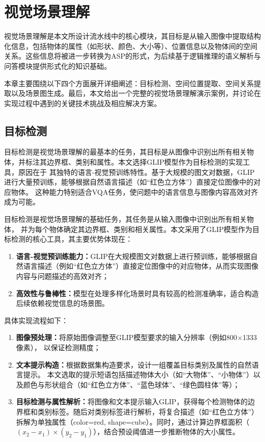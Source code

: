 \section{视觉场景理解}\label{visual-recognition}
视觉场景理解是本文所设计流水线中的核心模块，其目标是从输入图像中提取结构化信息，包括物体的属性（如形状、颜色、大小等）、位置信息以及物体间的空间关系。这些信息将被进一步转换为ASP的形式，为后续基于逻辑推理的语义解析与问答模块提供形式化的知识基础。

本章主要围绕以下四个方面展开详细阐述：目标检测、空间位置提取、空间关系提取以及场景图生成。最后，本文给出一个完整的视觉场景理解演示案例，并讨论在实现过程中遇到的关键技术挑战及相应解决方案。
\subsection{目标检测}
目标检测是视觉场景理解的最基本的任务，其目标是从图像中识别出所有相关物体，并标注其边界框、类别和属性。本文选择GLIP模型作为目标检测的实现工具，原因在于
其独特的语言-视觉预训练特性。基于大规模的图文对数据，GLIP进行大量预训练，能够根据自然语言描述（如“红色立方体”）直接定位图像中的对应物体。
这种能力特别适合VQA任务，使问题中的语言信息与图像内容高效对齐成为可能。

目标检测是视觉场景理解的基础任务，其任务是从输入图像中识别出所有相关物体，
并为每个物体确定其边界框、类别和相关属性。本文采用了GLIP模型作为目标检测的核心工具，其主要优势体现在：
\begin{enumerate}[label=(\arabic*),itemsep=0pt,parsep=0pt] 
\item \textbf{语言-视觉预训练能力：}GLIP在大规模图文对数据上进行预训练，能够根据自然语言描述（例如“红色立方体”）直接定位图像中的对应物体，从而实现图像内容与问题描述的高效对齐； 
\item \textbf{高效性与鲁棒性：}模型在处理多样化场景时具有较高的检测准确率，适合构造后续依赖视觉信息的场景图。 
\end{enumerate}

具体实现流程如下：
\begin{enumerate}[label=(\arabic*),itemsep=0pt] 
\item \textbf{图像预处理：}将原始图像调整至GLIP模型要求的输入分辨率（例如800$\times$1333像素），
以保证检测精度； 
\item \textbf{文本提示构造：}根据数据集构造要求，设计一组覆盖目标类别及属性的自然语言提示。
本文选取的提示短语包括描述物体大小（如“大物体”、“小物体”）以及颜色与形状组合（如“红色立方体”、“蓝色球体”、“绿色圆柱体”等）； 
\item \textbf{目标检测与属性解析：}将图像和文本提示输入GLIP，获得每个检测物体的边界框和类别标签。随后对类别标签进行解析，将复合描述（如“红色立方体”）拆解为单独属性（color=red, shape=cube）。同时，通过计算边界框面积（$(x_2 - x_1)\times(y_2 - y_1)$），结合预设阈值进一步推断物体的大小属性。 
\end{enumerate}

